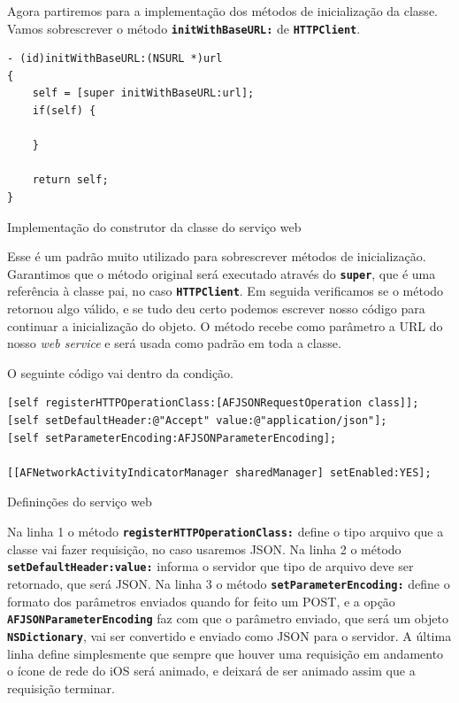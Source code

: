 \documentclass[a4paper,12pt,brazil,doubleside]{book}
\begin{document}
\begin{singlespace}
Agora partiremos para a implementação dos métodos de inicialização da classe. Vamos sobrescrever o método \texttt{\textbf{initWithBaseURL:}} de \texttt{\textbf{HTTPClient}}.

\begin{listing}[H]
\begin{verbatim}
- (id)initWithBaseURL:(NSURL *)url
{
    self = [super initWithBaseURL:url];
    if(self) {
    
    }
    
    return self;
}
\end{verbatim}
\caption{Implementação do construtor da classe do serviço web}
\end{listing}


Esse é um padrão muito utilizado para sobrescrever métodos de inicialização. Garantimos que o método original será executado através do \texttt{\textbf{super}}, que é uma referência à classe pai, no caso  \texttt{\textbf{HTTPClient}}. Em seguida verificamos se o método retornou algo válido, e se tudo deu certo podemos escrever nosso código para continuar a inicialização do objeto. O método recebe como parâmetro a URL do nosso \emph{web service} e será usada como padrão em toda a classe.

O seguinte código vai dentro da condição.

\begin{listing}[H]
\begin{verbatim}
[self registerHTTPOperationClass:[AFJSONRequestOperation class]];
[self setDefaultHeader:@"Accept" value:@"application/json"];
[self setParameterEncoding:AFJSONParameterEncoding];

[[AFNetworkActivityIndicatorManager sharedManager] setEnabled:YES];
\end{verbatim}
\caption{Defininções do serviço web}
\end{listing}


Na linha 1 o método \texttt{\textbf{registerHTTPOperationClass:}} define o tipo arquivo que a classe vai fazer requisição, no caso usaremos JSON. Na linha 2 o método\\ \texttt{\textbf{setDefaultHeader:value:}} informa o servidor que tipo de arquivo deve ser retornado, que será JSON. Na linha 3 o método \texttt{\textbf{setParameterEncoding:}} define o formato dos parâmetros enviados quando for feito um POST, e a opção \texttt{\textbf{AFJSONParameterEncoding}} faz com que o parâmetro enviado, que será um objeto \texttt{\textbf{NSDictionary}}, vai ser convertido e enviado como JSON para o servidor. A última linha define simplesmente que sempre que houver uma requisição em andamento o ícone de rede do iOS será animado, e deixará de ser animado assim que a requisição terminar.


\end{singlespace}
\end{document}
